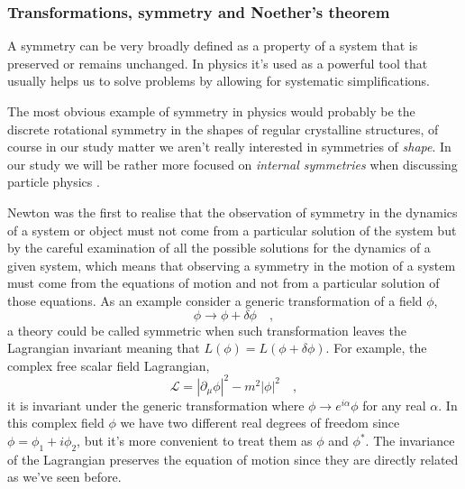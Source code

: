 \documentclass[12pt]{article}
\begin{document}
\subsubsection{Transformations, symmetry and Noether's theorem}

A symmetry can be very broadly defined as a property of a system that is preserved or remains unchanged. In physics it's used as a powerful tool that usually helps us to solve problems by allowing for systematic simplifications. 

The most obvious example of symmetry in physics would probably be the discrete rotational symmetry in the shapes of regular crystalline structures, of course in our study matter we aren't really interested in symmetries of \textit{shape}. In our study we will be rather more focused on \textit{internal symmetries} when discussing particle physics \cite{costa2012symmetries}. %

Newton was the first to realise that the observation of symmetry in the dynamics of a system or object must not come from a particular solution of the system but by the careful examination of all the possible solutions for the dynamics of a given system, which means that observing a symmetry in the motion of a system must come from the equations of motion and not from a particular solution of those equations. 
%
As an example consider a generic transformation of a field $\phi$,
%
\begin{equation}
\phi \rightarrow \phi + \delta \phi \quad , 
\end{equation}
%
a theory could be called symmetric when such transformation leaves the Lagrangian invariant meaning that $L(\phi)=L(\phi + \delta \phi)$. For example, the complex free scalar field Lagrangian, 
%
\begin{equation}
\mathcal{L} = | \partial_\mu \phi | ^2 - m^2 |\phi|^2 \quad ,
\end{equation}
%
it is invariant under the generic transformation where $\phi  \rightarrow e^{i \alpha } \phi$  for any real $\alpha$. In this complex field $\phi$ we have two different real degrees of freedom since $\phi = \phi_1 + i \phi_2$, but it's more convenient to treat them as $\phi$ and $\phi^*$. The invariance of the Lagrangian preserves the equation of motion since they are directly related as we've seen before. 
\end{document}
